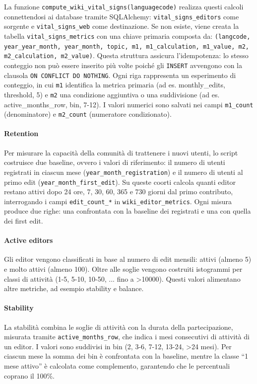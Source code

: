 La funzione \texttt{compute\_wiki\_vital\_signs(languagecode)} realizza questi calcoli connettendosi ai database tramite SQLAlchemy: 
\texttt{vital\_signs\_editors} come sorgente e \texttt{vital\_signs\_web} come destinazione. 
Se non esiste, viene creata la tabella \texttt{vital\_signs\_metrics} con una chiave primaria composta da: 
\texttt{(langcode, year\_year\_month, year\_month, topic, m1, m1\_calculation, m1\_value, m2, m2\_calculation, m2\_value)}. 
Questa struttura assicura l’idempotenza: lo stesso conteggio non può essere inserito più volte poiché gli \texttt{INSERT} avvengono con la clausola \texttt{ON CONFLICT DO NOTHING}. 
Ogni riga rappresenta un esperimento di conteggio, in cui \texttt{m1} identifica la metrica primaria (ad es. monthly\_edits, threshold, 5) e \texttt{m2} una condizione aggiuntiva o una suddivisione (ad es. active\_months\_row, bin, 7-12). I valori numerici sono salvati nei campi \texttt{m1\_count} (denominatore) e \texttt{m2\_count} (numeratore condizionato).

\paragraph{Retention}  
Per misurare la capacità della comunità di trattenere i nuovi utenti, lo script costruisce due baseline, ovvero i valori di riferimento: il numero di utenti registrati in ciascun mese (\texttt{year\_month\_registration}) e il numero di utenti al primo edit (\texttt{year\_month\_first\_edit}). 
Su queste coorti calcola quanti editor restano attivi dopo 24 ore, 7, 30, 60, 365 e 730 giorni dal primo contributo, interrogando i campi \texttt{edit\_count\_*} in \texttt{wiki\_editor\_metrics}. 
Ogni misura produce due righe: una confrontata con la baseline dei registrati e una con quella dei first edit.

\paragraph{Active editors}  
Gli editor vengono classificati in base al numero di edit mensili: attivi (almeno 5) e molto attivi (almeno 100). 
Oltre alle soglie vengono costruiti istogrammi per classi di attività (1-5, 5-10, 10-50, ... fino a >10000). 
Questi valori alimentano altre metriche, ad esempio stability e balance.

\paragraph{Stability}  
La stabilità combina le soglie di attività con la durata della partecipazione, misurata tramite \texttt{active\_months\_row}, che indica i mesi consecutivi di attività di un editor. 
I valori sono suddivisi in bin (2, 3-6, 7-12, 13-24, \textgreater 24 mesi). 
Per ciascun mese la somma dei bin è confrontata con la baseline, mentre la classe ``1 mese attivo'' è calcolata come complemento, garantendo che le percentuali coprano il 100\%.

